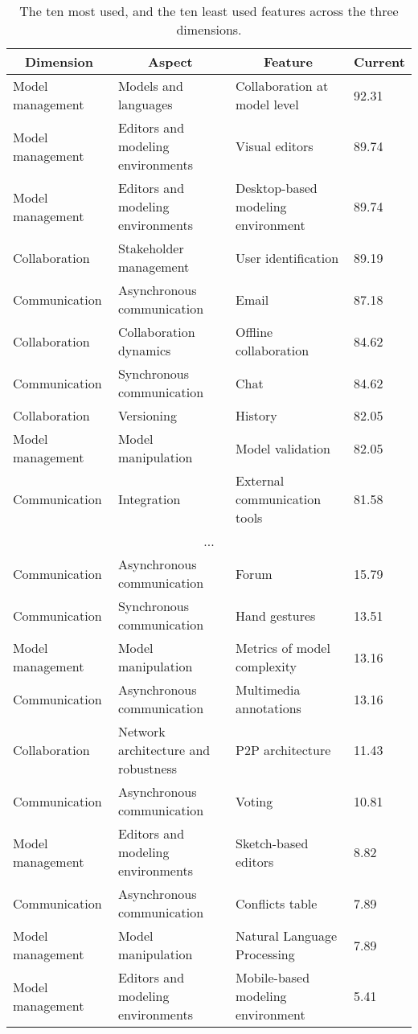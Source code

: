
  \begin{table*}[]
  \centering
  \notsotiny
  \caption{ The ten most used, and the ten least used features across the three dimensions.}
\label{tab:top-bottom-current}
\begin{tabular}{@{}llll@{}}
  \toprule
\multicolumn{1}{c}{\textbf{Dimension}} & \multicolumn{1}{c}{\textbf{Aspect}} & \multicolumn{1}{c}{\textbf{Feature}} & \multicolumn{1}{c}{\textbf{Current}} \\ 

  \midrule
  Model management & Models and languages & Collaboration at model level & 92.31 \\ 
Model management & Editors and modeling environments & Visual editors & 89.74 \\ 
Model management & Editors and modeling environments & Desktop-based modeling environment & 89.74 \\ 
Collaboration & Stakeholder management & User identification & 89.19 \\ 
Communication & Asynchronous communication & Email & 87.18 \\ 
Collaboration & Collaboration dynamics & Offline collaboration & 84.62 \\ 
Communication & Synchronous communication & Chat & 84.62 \\ 
Collaboration & Versioning & History & 82.05 \\ 
Model management & Model manipulation & Model validation & 82.05 \\ 
Communication & Integration & External communication tools & 81.58 \\ 
\multicolumn{4}{c}{...} \\ 
Communication & Asynchronous communication & Forum & 15.79 \\ 
Communication & Synchronous communication & Hand gestures & 13.51 \\ 
Model management & Model manipulation & Metrics of model complexity & 13.16 \\ 
Communication & Asynchronous communication & Multimedia annotations & 13.16 \\ 
Collaboration & Network architecture and robustness & P2P architecture & 11.43 \\ 
Communication & Asynchronous communication & Voting & 10.81 \\ 
Model management & Editors and modeling environments & Sketch-based editors & 8.82 \\ 
Communication & Asynchronous communication & Conflicts table & 7.89 \\ 
Model management & Model manipulation & Natural Language Processing & 7.89 \\ 
Model management & Editors and modeling environments & Mobile-based modeling environment & 5.41 \\ 
\bottomrule
  \end{tabular}%
  \end{table*}